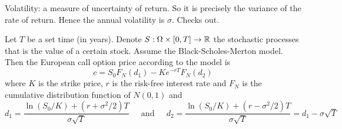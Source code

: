 \documentclass[a4paper]{article}
\begin{document}
Volatility: a measure of uncertainty of return. So it is precisely the variance of the rate of return. Hence the annual volatility is $\sigma$. Checks out. 

\begin{prp}{}{} Let $T$ be a set time (in years). Denote $S:\Omega\times[0,T]\to\mathbb{R}$ the stochastic processes that is the value of a certain stock. Assume the Black-Scholes-Merton model. Then the European call option price according to the model is $$c=S_0 F_N(d_1)-Ke^{-rT}F_N(d_2)$$ where $K$ is the strike price, $r$ is the risk-free interest rate and $F_N$ is the cumulative distribution function of $N(0,1)$ and $$d_1=\frac{\ln(S_0/K)+(r+\sigma^2/2)T}{\sigma\sqrt{T}}\;\;\;\;\text{ and }\;\;\;\;d_2=\frac{\ln(S_0/K)+(r-\sigma^2/2)T}{\sigma\sqrt{T}}=d_1-\sigma\sqrt{T}$$
\end{prp}
\end{document}
